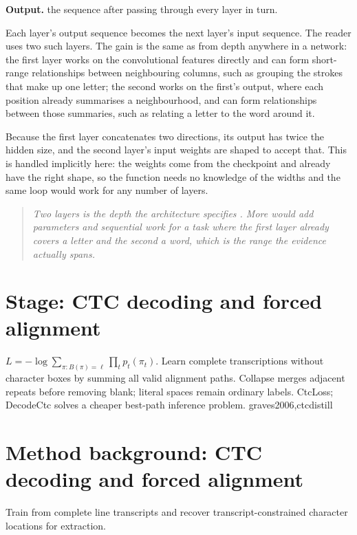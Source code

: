 \noindent\textbf{Output.} the sequence after passing through every layer in turn.


Each layer's output sequence becomes the next layer's input sequence. The reader uses two such layers. The gain is the same as from depth anywhere in a network: the first layer works on the convolutional features directly and can form short-range relationships between neighbouring columns, such as grouping the strokes that make up one letter; the second works on the first's output, where each position already summarises a neighbourhood, and can form relationships between those summaries, such as relating a letter to the word around it.


Because the first layer concatenates two directions, its output has twice the hidden size, and the second layer's input weights are shaped to accept that. This is handled implicitly here: the weights come from the checkpoint and already have the right shape, so the function needs no knowledge of the widths and the same loop would work for any number of layers.


\begin{quote}\small\itshape Two layers is the depth the architecture specifies \cite{shi2017}. More would add parameters and sequential work for a task where the first layer already covers a letter and the second a word, which is the range the evidence actually spans.\end{quote}


\section*{Stage: CTC decoding and forced alignment}
{$L=-\log\sum_{\pi:B(\pi)=\ell}\prod_t p_t(\pi_t)$.}
{Learn complete transcriptions without character boxes by summing all valid
alignment paths. Collapse merges adjacent repeats before removing blank;
literal spaces remain ordinary labels.}
{CtcLoss; DecodeCtc solves a cheaper best-path inference problem.}
{graves2006,ctcdistill}


\section{Method background: CTC decoding and forced alignment}\label{method:ctc}
Train from complete line transcripts and recover transcript-constrained character locations for extraction.


